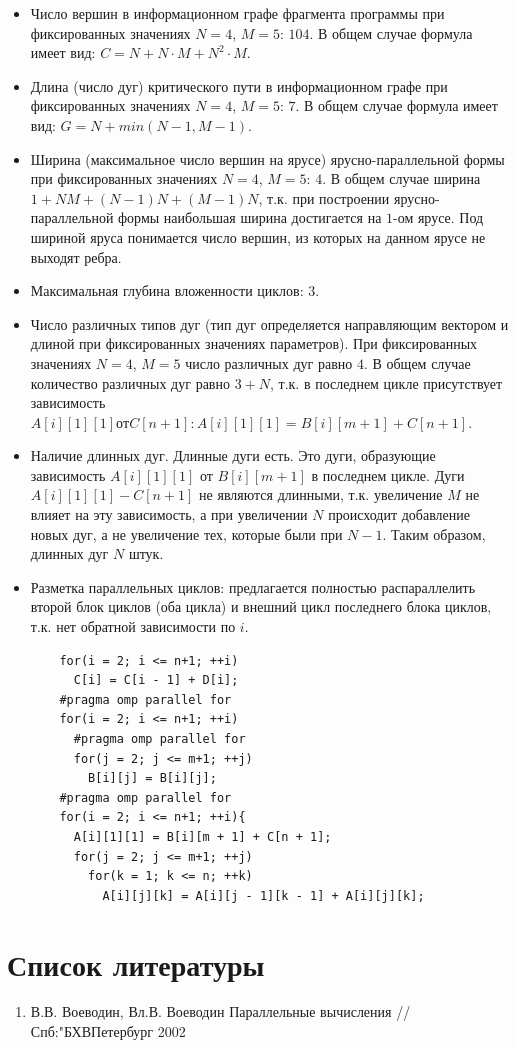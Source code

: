 \documentclass[a4paper, 12pt]{article}
\begin{document}
	\begin{itemize}
		\item Число вершин в информационном графе фрагмента программы при фиксированных значениях $N = 4$, $M = 5$: $104$. В общем случае формула имеет вид: $C = N + N \cdot M + N^2 \cdot M$.
		\item Длина (число дуг) критического пути в информационном графе при фиксированных значениях $N = 4$, $M = 5$: $7$. В общем случае формула имеет вид: $G = N + min\left(N - 1, M - 1\right)$.
		\item Ширина (максимальное число вершин на ярусе) ярусно-параллельной формы при фиксированных значениях $N = 4$, $M = 5$: $4$. В общем случае ширина $1 + NM + (N -1)N + (M - 1)N$, т.к. при построении ярусно-параллельной формы наибольшая ширина достигается на $1$-ом ярусе. Под шириной яруса понимается число вершин, из которых на данном ярусе не выходят ребра.
		\item Максимальная глубина вложенности циклов: $3$.
		\item Число различных типов дуг (тип дуг определяется направляющим вектором и длиной при фиксированных значениях параметров). При фиксированных значениях $N = 4$, $M = 5$ число различных дуг равно $4$. В общем случае количество различных дуг равно $3 + N$, т.к. в последнем цикле присутствует зависимость $A[i][1][1] от C[n + 1]: A[i][1][1] = B[i][m + 1] + C[n + 1]$.
		\item Наличие длинных дуг. Длинные дуги есть. Это дуги, образующие зависимость $A[i][1][1]$ от $B[i][m + 1]$ в последнем цикле. Дуги $A[i][1][1] - C[n + 1]$ не являются длинными, т.к. увеличение $M$ не влияет на эту зависимость, а при увеличении $N$ происходит добавление новых дуг, а не увеличение тех, которые были при $N - 1$. Таким образом, длинных дуг $N$ штук.
		\item Разметка параллельных циклов: предлагается полностью распараллелить второй блок циклов (оба цикла) и внешний цикл последнего блока циклов, т.к. нет обратной зависимости по $i$.
		
			\lstset{language=C}
			\begin{lstlisting}
	for(i = 2; i <= n+1; ++i)
	  C[i] = C[i - 1] + D[i];
	#pragma omp parallel for
	for(i = 2; i <= n+1; ++i)
	  #pragma omp parallel for
	  for(j = 2; j <= m+1; ++j)
	    B[i][j] = B[i][j];
	#pragma omp parallel for
	for(i = 2; i <= n+1; ++i){
	  A[i][1][1] = B[i][m + 1] + C[n + 1];
	  for(j = 2; j <= m+1; ++j)
	    for(k = 1; k <= n; ++k)
	      A[i][j][k] = A[i][j - 1][k - 1] + A[i][j][k];
			\end{lstlisting}
	\end{itemize}

	\newpage
	
	\section*{Список литературы}
	
	\begin{enumerate}
		\item В.В. Воеводин, Вл.В. Воеводин Параллельные вычисления // Спб:"БХВПетербург 2002
	\end{enumerate}
\end{document}
